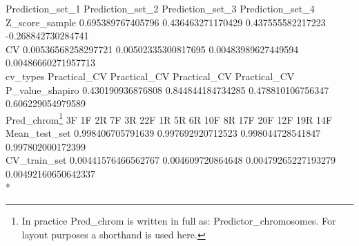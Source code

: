 \selectfont %
\tiny %
\noindent \hspace{16mm}	Prediction\_set\_1	\hspace{3mm} Prediction\_set\_2 \hspace{3mm} Prediction\_set\_3 \hspace{3mm} Prediction\_set\_4 \\
Z\_score\_sample  \hspace{1mm} 	0.695389767405796 \hspace{1mm} 0.436463271170429 \hspace{1mm} 0.437555582217223 \hspace{1mm} -0.268842730284741 \\
CV \hspace{13mm}	0.00536568258297721 0.00502335300817695 0.00483989627449594 0.00486660271957713 \\
cv\_types  \hspace{7mm}	Practical\_CV \hspace{7mm} Practical\_CV \hspace{7mm} Practical\_CV \hspace{6.3mm} Practical\_CV \\
P\_value\_shapiro \hspace{0mm}	0.430190936876808 \hspace{1mm} 0.844844184734285 \hspace{1.5mm} 0.478810106756347 \hspace{0.7mm} 0.606229054979589 \\
Pred\_chrom\footnote{In practice Pred\_chrom is written in full as: Predictor\_chromosomes. For layout purposes a shorthand is used here.} \hspace{4mm} 3F  1F  2R  7F \hspace{7mm}	3R  22F  1R  5R \hspace{7mm} 6R  10F  8R  17F \hspace{5mm} 20F  12F  19R  14F \\
Mean\_test\_set \hspace{2mm} 0.998406705791639 \hspace{1.2mm}	0.997692920712523 \hspace{1.7mm} 0.998044728541847 \hspace{1.1mm} 0.997802000172399 \\
CV\_train\_set \hspace{3mm} 0.00441576466562767 \hspace{0mm} 0.004609720864648 \hspace{0.9mm} 0.00479265227193279 \hspace{0.5mm}0.00492160650642337 \\*
\selectfont %
\normalsize %

